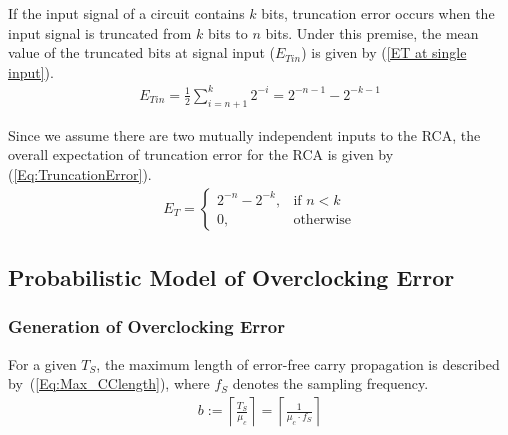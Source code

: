 \documentclass[prodmode,acmtrets]{acmsmall} %
\begin{document}
If the input signal of a circuit contains $k$ bits, truncation error occurs when the input signal is truncated from $k$ bits to $n$ bits. Under this premise, the mean value of the truncated bits at signal input ($E_{Tin}$) is given by (\ref{ET at single input}).
%
\begin{eqnarray}\label{ET at single input}
    E_{Tin} = \frac{1}{2}\sum_{i=n+1}^{k}2^{-i} = 2^{-n-1}-2^{-k-1}
\end{eqnarray}

Since we assume there are two mutually independent inputs to the RCA, the overall expectation of truncation error for the RCA is given by (\ref{Eq:TruncationError}).
%
\begin{eqnarray}\label{Eq:TruncationError}
  E_T=\left\{
    \begin{matrix}
        2^{-n}-2^{-k}, & \textrm{if $n<k$}\\
        0, & \textrm{otherwise}
    \end{matrix}
  \right.
\end{eqnarray}

\subsection{Probabilistic Model of Overclocking Error}
\subsubsection{Generation of Overclocking Error}\label{subsub:Generation of Overclocking Error}
For a given $T_S$, the maximum length of error-free carry propagation is described by~(\ref{Eq:Max_CClength}), where $f_S$ denotes the sampling frequency.
%
\begin{eqnarray}\label{Eq:Max_CClength}
    b := \left\lceil \frac{T_S}{\mu_c} \right\rceil= \left\lceil \frac{1}{\mu_c\cdot f_S}\right\rceil
\end{eqnarray}
\end{document}
